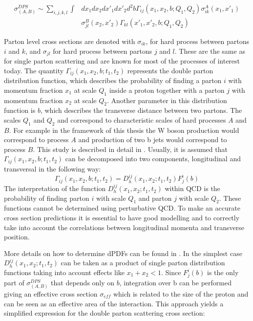 \begin{equation}
\begin{split}
\sigma_{(A,B)}^{DPS} \sim \sum\limits_{i,j,k,l} \int & dx_1 dx_2  dx'_1 dx'_2 d^2b  \Gamma_{ij}(x_1,x_2,b;Q_1,Q_2)\sigma_{ik}^A(x_1,x'_1) \\
 & \sigma_{jl}^B(x_2,x'_2) \Gamma_{kl}(x'_1,x'_2,b;Q_1,Q_2)
\end{split}
\end{equation}
\par Parton level cross sections are denoted with $\sigma_{ik}$, for hard process between partons $i$ and $k$, and $\sigma_{jl}$ for hard process between partons $j$ and $l$. These are the same as for single parton scattering and are known for most of the processes of interest today. The quantity $\Gamma_{ij}(x_1,x_2,b;t_1,t_2)$ represents the double parton distribution function, which describes the probability of finding a parton $i$ with momentum fraction $x_1$ at scale $Q_1$ inside a proton together with a parton $j$ with momentum fraction $x_2$ at scale $Q_2$. Another parameter in this distribution function is $b$, which describes the transverse distance between two partons. The scales $Q_1$ and $Q_2$ and correspond to characteristic scales of hard processes $A$ and $B$. For example in the framework of this thesis the W boson production would correspond to process $A$ and production of two b jets would correspond to process $B$. This study is described in detail in \cite{Quackenbush:2011bf}. Usually, it is assumed that $\Gamma_{ij}(x_1,x_2,b;t_1,t_2)$ can be decomposed into two components, longitudinal and transversal in the following way:
\begin{equation}
\Gamma_{ij}(x_1,x_2,b;t_1,t_2) = D^{ij}_h(x_1,x_2;t_1,t_2)F_j^i(b)
\end{equation} 
The interpretation of the function $D^{ij}_h(x_1,x_2;t_1,t_2)$ within QCD is the probability of finding parton $i$ with scale $Q_1$ and parton $j$ with scale $Q_2$. These functions cannot be determined using perturbative QCD. To make an accurate cross section predictions it is essential to have good modelling and to correctly take into account the correlations between longitudinal momenta and transverse position. 
\par More details on how to determine dPDFs can be found in \cite{Gaunt:2009re}. In the simplest case $D^{ij}_h(x_1,x_2;t_1,t_2)$ can be taken as a product of single parton distribution functions taking into account effects like $x_1+x_2<1$. Since $F_j^i(b)$ is the only part of $\sigma_{(A,B)}^{DPS}$ that depends only on $b$, integration over b can be performed giving an effective cross section $\sigma_{eff}$ which is related to the size of the proton and can be seen as an effective area of the interaction. This approach yields a simplified expression for the double parton scattering cross section:
